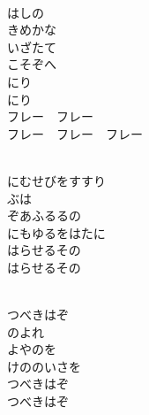 \documentclass[10pt,b5j]{tarticle} %
\begin{document}
\vspace{1.5em} %
\newcommand{\linespace}{0.5em} %
\newcommand{\blocksize}{0.5\hsize} %
\newcommand{\itemmargin}{3em} %
\begin{enumerate} %
    \setlength{\itemindent}{\itemmargin} %
    \begin{minipage}[c]{\blocksize}
    
        \vspace{\linespace}
        \item~\\
        はしの\\
        きめかな\\
        いざたて\\
        こそぞへ\\
        にり\\
        にり\\
        フレー　フレー\\
        フレー　フレー　フレー
        
    \end{minipage}
    \begin{minipage}[c]{\blocksize}
        
        \vspace{\linespace}
        \item~\\
        にむせびをすすり\\
        ぶは\\
        ぞあふるるの\\
        にもゆるをはたに\\
        はらせるその\\
        はらせるその
        
    \end{minipage}
    \begin{minipage}[c]{\blocksize}
        
        \vspace{\linespace}
        \item~\\
        つべきはぞ\\
        のよれ\\
        よやのを\\
        けののいさを\\
        つべきはぞ\\
        つべきはぞ
    

\end{minipage}
\end{enumerate}
\end{document}
